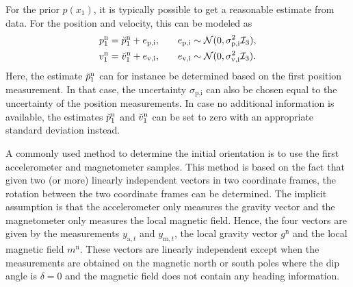 For the prior $p(x_1)$, it is typically possible to get a reasonable estimate from data. For the position and velocity, this can be modeled as
\begin{subequations}
\begin{align}
p^\text{n}_1 &= \breve{p}_1^\text{n} + e_{\text{p,i}}, \quad & e_{\text{p,i}} &\sim \mathcal{N}(0, \sigma^2_{\text{p,i}} \mathcal{I}_3), \\
v^\text{n}_1 &= \breve{v}_1^\text{n} + e_{\text{v,i}}, \quad & e_{\text{v,i}} &\sim \mathcal{N}(0, \sigma^2_{\text{v,i}} \mathcal{I}_3).
\end{align}
\end{subequations}
Here, the estimate $\breve{p}_1^\text{n}$ can for instance be determined based on the first position measurement. In that case, the uncertainty $\sigma_{\text{p,i}}$ can also be chosen equal to the uncertainty of the position measurements. In case no additional information is available, the estimates $\breve{p}_1^\text{n}$ and $\breve{v}_1^\text{n}$ can be set to zero with an appropriate standard deviation instead.

A commonly used method to determine the initial orientation is to use the first accelerometer and magnetometer samples. This method is based on the fact that given two (or more) linearly independent vectors in two coordinate frames, the rotation between the two coordinate frames can be determined. The implicit assumption is that the accelerometer only measures the gravity vector and the magnetometer only measures the local magnetic field. Hence, the four vectors are given by the measurements $y_{\text{a},t}$ and $y_{\text{m},t}$, the local gravity vector $g^\text{n}$ and the local magnetic field $m^\text{n}$. These vectors are linearly independent except when the measurements are obtained on the magnetic north or south poles where the dip angle is $\delta = 0$ and the magnetic field does not contain any heading information. 

